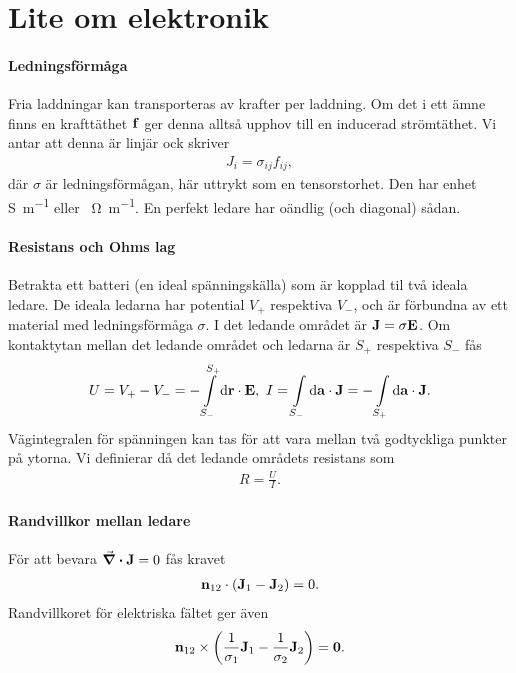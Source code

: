 \section{Lite om elektronik}

\paragraph{Ledningsförmåga}
Fria laddningar kan transporteras av krafter per laddning. Om det i ett ämne finns en krafttäthet $\vb{f}$ ger denna alltså upphov till en inducerad strömtäthet. Vi antar att denna är linjär ock skriver
\begin{align*}
	J_{i} = \sigma_{ij}f_{ij},
\end{align*}
där $\sigma$ är ledningsförmågan, här uttrykt som en tensorstorhet. Den har enhet \si{\siemens\per\meter} eller \si{\per\ohm\per\meter}. En perfekt ledare har oändlig (och diagonal) sådan.

\paragraph{Resistans och Ohms lag}
Betrakta ett batteri (en ideal spänningskälla) som är kopplad til två ideala ledare. De ideala ledarna har potential $V_{+}$ respektiva $V_{-}$, och är förbundna av ett material med ledningsförmåga $\sigma$. I det ledande området är $\vb{J} = \sigma\vb{E}$. Om kontaktytan mellan det ledande området och ledarna är $S_{+}$ respektiva $S_{-}$ fås
\begin{align*}
	U = V_{+} - V_{-} = -\int\limits_{S_{-}}^{S_{+}}\dd{\vb{\vb{r}}}\cdot \vb{E},\ I = \int\limits_{S_{-}}^{}\dd{\vb{\vb{a}}}\cdot \vb{J} = -\int\limits_{S_{+}}^{}\dd{\vb{\vb{a}}}\cdot \vb{J}.
\end{align*}
Vägintegralen för spänningen kan tas för att vara mellan två godtyckliga punkter på ytorna. Vi definierar då det ledande områdets resistans som
\begin{align*}
	R = \frac{U}{I}.
\end{align*}

\paragraph{Randvillkor mellan ledare}
För att bevara $\div{\vb{J}} = 0$ fås kravet
\begin{align*}
	\vb{n}_{12}\cdot(\vb{J}_{1} - \vb{J}_{2}) = 0.
\end{align*}
Randvillkoret för elektriska fältet ger även
\begin{align*}
	\vb{n}_{12}\times\left(\frac{1}{\sigma_{1}}\vb{J}_{1} - \frac{1}{\sigma_{2}}\vb{J}_{2}\right) = \vb{0}.
\end{align*}


